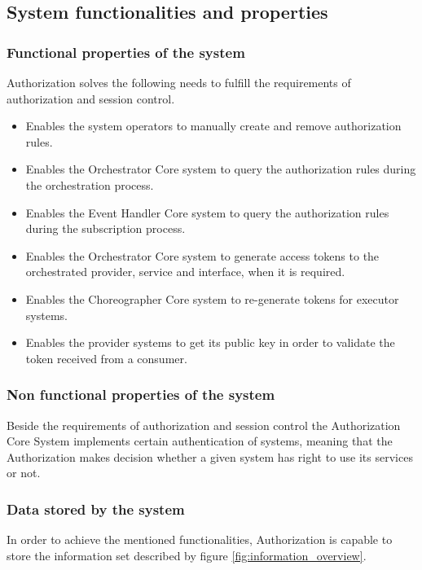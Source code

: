 \documentclass[a4paper]{arrowhead}
\begin{document}
\subsection{System functionalities and properties}
\label{sec:properties}

\subsubsection {Functional properties of the system}
Authorization solves the following needs to fulfill the requirements of authorization and session control.

\begin{itemize}
    \item Enables the system operators to manually create and remove authorization rules.
    \item Enables the Orchestrator Core system to query the authorization rules during the orchestration process.
    \item Enables the Event Handler Core system to query the authorization rules during the subscription process.
    \item Enables the Orchestrator Core system to generate access tokens to the orchestrated provider, service and interface, when it is required.
    \item Enables the Choreographer Core system to re-generate tokens for executor systems.
    \item Enables the provider systems to get its public key in order to validate the token received from a consumer.
\end{itemize}

\subsubsection {Non functional properties of the system}
Beside the requirements of authorization and session control the Authorization Core System implements certain authentication of systems, meaning that the Authorization makes decision whether a given system has right to use its services or not.

\subsubsection {Data stored by the system}
In order to achieve the mentioned functionalities, Authorization is capable to store the information set described by figure \ref{fig:information_overview}.
\end{document}
